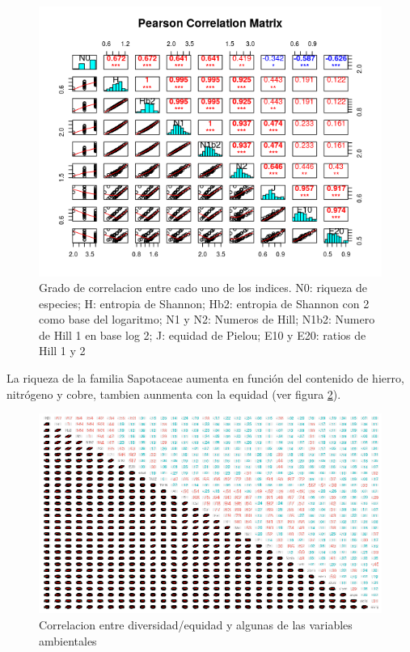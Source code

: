 \documentclass[11pt,]{article}
\begin{document}
\begin{figure}
\centering
\includegraphics[width=1.00000\textwidth]{correlacion_pearson.png}
\caption{Grado de correlacion entre cado uno de los indices. N0: riqueza
de especies; H: entropia de Shannon; Hb2: entropia de Shannon con 2 como
base del logaritmo; N1 y N2: Numeros de Hill; N1b2: Numero de Hill 1 en
base log 2; J: equidad de Pielou; E10 y E20: ratios de Hill 1 y 2
\label{fig:correlacion_indices}}
\end{figure}

La riqueza de la familia Sapotaceae aumenta en función del contenido de
hierro, nitrógeno y cobre, tambien aunmenta con la equidad (ver figura
\ref{fig:correlacion_diversidad_equidad}).

\begin{figure}
\centering
\includegraphics[width=1.00000\textwidth]{correlacion_diversidad_equidad_actualizado.png}
\caption{Correlacion entre diversidad/equidad y algunas de las variables
ambientales \label{fig:correlacion_diversidad_equidad}}
\end{figure}
\end{document}
